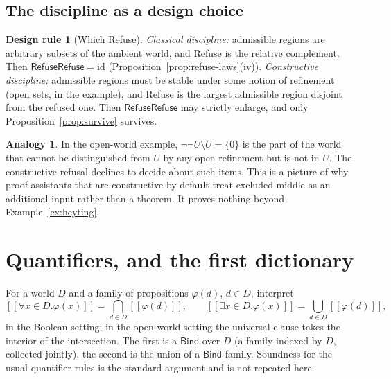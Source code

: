 \documentclass[11pt]{article}
\newcommand{\Refuse}{\mathsf{Refuse}}
\newcommand{\Bind}{\mathsf{Bind}}
\newcommand{\sem}[1]{[\![#1]\!]}
\theoremstyle{definition}
\newtheorem{designrule}[definition]{Design rule}
\newtheorem{analogy}[definition]{Analogy}
\theoremstyle{plain}
\theoremstyle{remark}
\begin{document}
\subsection{The discipline as a design choice}

\begin{designrule}[Which Refuse]\label{dr:refuse}
\emph{Classical discipline:} admissible regions are arbitrary subsets of the ambient world, and Refuse is the relative complement. Then $\Refuse\Refuse=\mathrm{id}$ (Proposition~\ref{prop:refuse-laws}(iv)).
\emph{Constructive discipline:} admissible regions must be stable under some notion of refinement (open sets, in the example), and Refuse is the largest admissible region disjoint from the refused one. Then $\Refuse\Refuse$ may strictly enlarge, and only Proposition~\ref{prop:survive} survives.
\end{designrule}

\begin{analogy}\label{an:constructive}
In the open-world example, $\neg\neg U\setminus U=\{0\}$ is the part of the world that cannot be distinguished from $U$ by any open refinement but is not in $U$. The constructive refusal declines to decide about such items. This is a picture of why proof assistants that are constructive by default treat excluded middle as an additional input rather than a theorem. It proves nothing beyond Example~\ref{ex:heyting}.
\end{analogy}

\section{Quantifiers, and the first dictionary}\label{sec:quant}

For a world $D$ and a family of propositions $\varphi(d)$, $d\in D$, interpret
\[
\sem{\forall x\in D.\varphi(x)}=\bigcap_{d\in D}\sem{\varphi(d)},\qquad
\sem{\exists x\in D.\varphi(x)}=\bigcup_{d\in D}\sem{\varphi(d)},
\]
in the Boolean setting; in the open-world setting the universal clause takes the interior of the intersection. The first is a $\Bind$ over $D$ (a family indexed by $D$, collected jointly), the second is the union of a $\Bind$-family. Soundness for the usual quantifier rules is the standard argument and is not repeated here.
\end{document}
